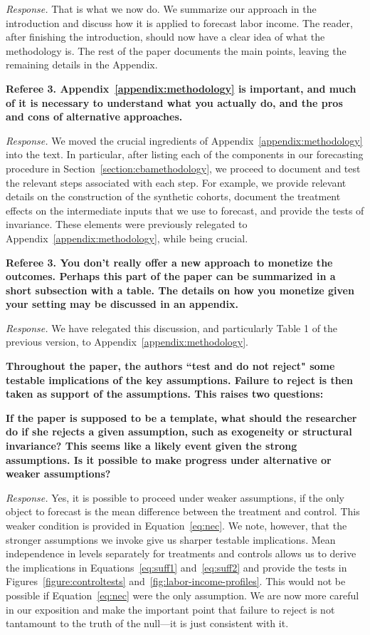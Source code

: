 \noindent \textit{Response.} That is what we now do. We summarize our approach in the introduction and discuss how it is applied to forecast labor income. The reader, after finishing the introduction, should now have a clear idea of what the methodology is. The rest of the paper documents the main points, leaving the remaining details in the Appendix.

\noindent \textbf{Referee 3. Appendix~\ref{appendix:methodology} is important, and much of it is necessary to understand what you actually do, and the pros and cons of alternative approaches.}

\noindent \textit{Response.} We moved the crucial ingredients of Appendix~\ref{appendix:methodology} into the text. In particular, after listing each of the components in our forecasting procedure in Section~\ref{section:cbamethodology}, we proceed to document and test the relevant steps associated with each step. For example, we provide relevant details on the construction of the synthetic cohorts, document the treatment effects on the intermediate inputs that we use to forecast, and provide the tests of invariance. These elements were previously relegated to Appendix~\ref{appendix:methodology}, while being crucial.

\noindent \textbf{Referee 3. You don't really offer a new approach to monetize the outcomes. Perhaps this part of the paper can be summarized in a short subsection with a table. The details on how you monetize given your setting may be discussed in an appendix.}

\noindent \textit{Response.} We have relegated this discussion, and particularly Table 1 of the previous version, to Appendix~\ref{appendix:methodology}.

\noindent \textbf{Throughout the paper, the authors ``test and do not reject" some testable implications of the key assumptions. Failure to reject is then taken as support of the assumptions. This raises two questions:}

\noindent \textbf{If the paper is supposed to be a template, what should the researcher do if she rejects a given assumption, such as exogeneity or structural invariance? This seems like a likely event given the strong assumptions. Is it possible to make progress under alternative or weaker assumptions?}

\noindent \textit{Response.} Yes, it is possible to proceed under weaker assumptions, if the only object to forecast is the mean difference between the treatment and control. This weaker condition is provided in Equation~\eqref{eq:nec}. We note, however, that the stronger assumptions we invoke give us sharper testable implications. Mean independence in levels separately for treatments and controls allows us to derive the implications in Equations~\eqref{eq:suff1} and~\eqref{eq:suff2} and provide the tests in Figures~\ref{figure:controltests} and~\ref{fig:labor-income-profiles}. This would not be possible if Equation~\eqref{eq:nec} were the only assumption. We are now more careful in our exposition and make the important point that failure to reject is not tantamount to the truth of the null---it is just consistent with it.

